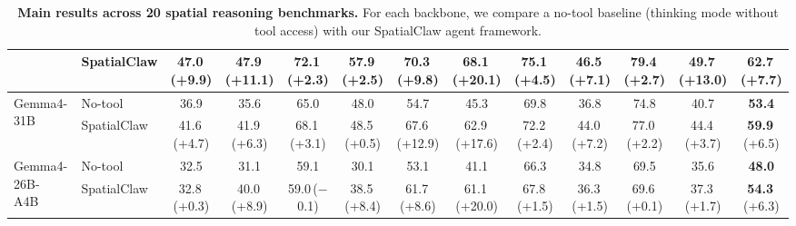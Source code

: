 \documentclass{llmxive}
\providecommand{\ours}{SpatialClaw}
\providecommand{\up}[1]{\,{\scriptsize(+#1)}}
\providecommand{\dn}[1]{\,{\scriptsize($-$#1)}}
\begin{document}
\begin{table}[t]
{{\begin{tabular}{ll cccccc cccc >{\columncolor{gray!15}}c}
& \ours{}  & 47.0\up{9.9} & 47.9\up{11.1} & 72.1\up{2.3} & 57.9\up{2.5} & 70.3\up{9.8} & 68.1\up{20.1} & 75.1\up{4.5} & 46.5\up{7.1} & 79.4\up{2.7} & 49.7\up{13.0} & \textbf{62.7}\up{7.7} \\
\midrule
\multirow{2}{*}{Gemma4-31B~\citep{gemma4}}
  & No-tool & 36.9 & 35.6 & 65.0 & 48.0 & 54.7 & 45.3 & 69.8 & 36.8 & 74.8 & 40.7 & \textbf{53.4} \\
  & \ours{}  & 41.6\up{4.7} & 41.9\up{6.3} & 68.1\up{3.1} & 48.5\up{0.5} & 67.6\up{12.9} & 62.9\up{17.6} & 72.2\up{2.4} & 44.0\up{7.2} & 77.0\up{2.2} & 44.4\up{3.7} & \textbf{59.9}\up{6.5} \\
\midrule
\multirow{2}{*}{Gemma4-26B-A4B~\citep{gemma4}}
  & No-tool & 32.5 & 31.1 & 59.1 & 30.1 & 53.1 & 41.1 & 66.3 & 34.8 & 69.5 & 35.6 & \textbf{48.0} \\
  & \ours{}  & 32.8\up{0.3} & 40.0\up{8.9} & 59.0\dn{0.1} & 38.5\up{8.4} & 61.7\up{8.6} & 61.1\up{20.0} & 67.8\up{1.5} & 36.3\up{1.5} & 69.6\up{0.1} & 37.3\up{1.7} & \textbf{54.3}\up{6.3} \\
\bottomrule
\end{tabular}%
}}
\caption{\textbf{Main results across 20 spatial reasoning benchmarks.} For each backbone, we compare a no-tool baseline (thinking mode without tool access) with our \ours{} agent framework. 
}
\label{tab:main_results}
\end{table}
\end{document}
